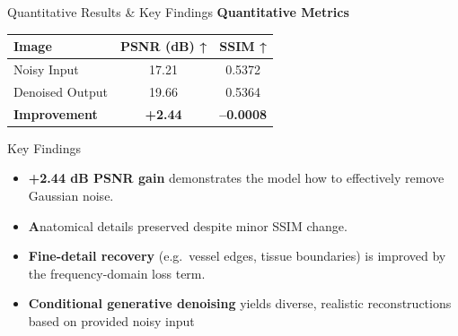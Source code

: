 \documentclass[10pt]{beamer}
\begin{document}
\begin{frame}{Quantitative Results \& Key Findings}
  \textbf{Quantitative Metrics}
  \begin{table}
    \centering
    \small
    \begin{tabular}{lcc}
      \toprule
      Image           & PSNR (dB) ↑ & SSIM ↑ \\
      \midrule
      Noisy Input     & 17.21       & 0.5372 \\
      Denoised Output & 19.66       & 0.5364 \\
      \midrule
      \textbf{Improvement} & \textbf{+2.44} & \textbf{–0.0008} \\
      \bottomrule
    \end{tabular}
  \end{table}
  \vspace{0.5em}
\begin{alertblock}{Key Findings}
  \begin{itemize}\small\itemsep0.3em
    \item \textbf{+2.44 dB PSNR gain} demonstrates the model how to effectively remove Gaussian noise.
    \item \textbf Anatomical details preserved despite minor SSIM change.
    \item \textbf{Fine-detail recovery} (e.g.\ vessel edges, tissue boundaries) is improved by the frequency-domain loss term.
    \item \textbf{Conditional generative denoising} yields diverse, realistic reconstructions based on provided noisy input
  \end{itemize}
\end{alertblock}

\end{frame}
\end{document}
